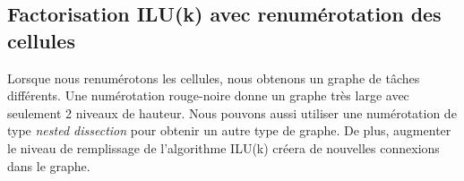 \subsection{Factorisation ILU(k) avec renumérotation des cellules}
Lorsque nous renumérotons les cellules, nous obtenons un graphe de tâches différents.
%
Une numérotation rouge-noire donne un graphe très large avec seulement 2 niveaux de hauteur.
%
Nous pouvons aussi utiliser une numérotation de type {\em nested dissection} pour obtenir un autre type de graphe.
%
De plus, augmenter le niveau de remplissage de l'algorithme ILU(k) créera de nouvelles connexions dans le graphe.
%
